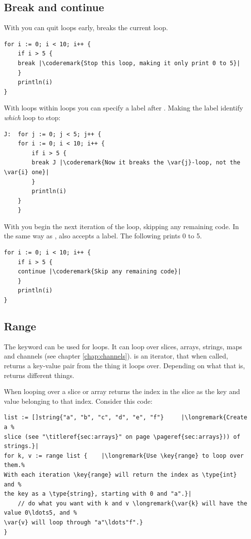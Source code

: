 \subsection{Break and continue}
With  you can quit loops early,  breaks
the current loop.
\begin{lstlisting}
for i := 0; i < 10; i++ {
    if i > 5 {
	break |\coderemark{Stop this loop, making it only print 0 to 5}|
    }
    println(i)
}
\end{lstlisting}
With loops within loops you can specify a label after .
Making the label identify \emph{which} loop to stop:
\begin{lstlisting}
J:  for j := 0; j < 5; j++ {
	for i := 0; i < 10; i++ {
	    if i > 5 { 
		break J	|\coderemark{Now it breaks the \var{j}-loop, not the \var{i} one}|
	    }
	    println(i)
	}
    } 
\end{lstlisting}

With  you begin the next iteration of the
loop, skipping any remaining code. In the same way as ,
 also accepts a label. The following prints 0 to 5.
\begin{lstlisting}
for i := 0; i < 10; i++ {
    if i > 5 {
	continue |\coderemark{Skip any remaining code}|
    }
    println(i)
}
\end{lstlisting}

\subsection{Range}
The keyword  can be used for loops. It
can loop over slices, arrays, strings, maps and channels (see chapter
\ref{chap:channels}).  is
an iterator, that when called, returns a key-value pair from the thing it
loops over. Depending on what that is,  returns
different things.

When looping over a slice or array  returns the index in the
slice as the key and value belonging to that index.
Consider this code: 
\begin{lstlisting}
list := []string{"a", "b", "c", "d", "e", "f"}     |\longremark{Create a %
slice (see "\titleref{sec:arrays}" on page \pageref{sec:arrays})) of strings.}|
for k, v := range list {	|\longremark{Use \key{range} to loop over them.%
With each iteration \key{range} will return the index as \type{int} and %
the key as a \type{string}, starting with 0 and "a".}|
    // do what you want with k and v \longremark{\var{k} will have the value 0\ldots5, and %
\var{v} will loop through "a"\ldots"f".}
}
\end{lstlisting}
\showremarks

